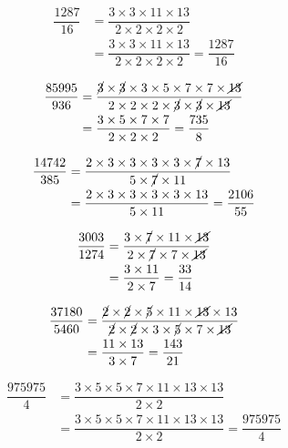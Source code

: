 {{\item\begin{align*}
    \dfrac{1287}{16} &=
    \dfrac{3 \times 3 \times 11 \times 13}
    {2 \times 2 \times 2 \times 2}\\ &=
    \dfrac{3 \times 3 \times 11 \times 13}
    {2 \times 2 \times 2 \times 2} =
    \dfrac{1287}{16}
    \end{align*}

\item\begin{align*}
    \dfrac{85995}{936} &=
    \dfrac{\cancel{3} \times \cancel{3} \times 3 \times 5 \times 7 \times 7 \times \cancel{13}}
    {2 \times 2 \times 2 \times \cancel{3} \times \cancel{3} \times \cancel{13}}\\ &=
    \dfrac{3 \times 5 \times 7 \times 7}
    {2 \times 2 \times 2} =
    \dfrac{735}{8}
    \end{align*}

\item\begin{align*}
    \dfrac{14742}{385} &=
    \dfrac{2 \times 3 \times 3 \times 3 \times 3 \times \cancel{7} \times 13}
    {5 \times \cancel{7} \times 11}\\ &=
    \dfrac{2 \times 3 \times 3 \times 3 \times 3 \times 13}
    {5 \times 11} =
    \dfrac{2106}{55}
    \end{align*}

\item\begin{align*}
    \dfrac{3003}{1274} &=
    \dfrac{3 \times \cancel{7} \times 11 \times \cancel{13}}
    {2 \times \cancel{7} \times 7 \times \cancel{13}}\\ &=
    \dfrac{3 \times 11}
    {2 \times 7} =
    \dfrac{33}{14}
    \end{align*}

\item\begin{align*}
    \dfrac{37180}{5460} &=
    \dfrac{\cancel{2} \times \cancel{2} \times \cancel{5} \times 11 \times \cancel{13} \times 13}
    {\cancel{2} \times \cancel{2} \times 3 \times \cancel{5} \times 7 \times \cancel{13}}\\ &=
    \dfrac{11 \times 13}
    {3 \times 7} =
    \dfrac{143}{21}
    \end{align*}

\item\begin{align*}
    \dfrac{975975}{4} &=
    \dfrac{3 \times 5 \times 5 \times 7 \times 11 \times 13 \times 13}
    {2 \times 2}\\ &=
    \dfrac{3 \times 5 \times 5 \times 7 \times 11 \times 13 \times 13}
    {2 \times 2} =
    \dfrac{975975}{4}
    \end{align*}

}}
